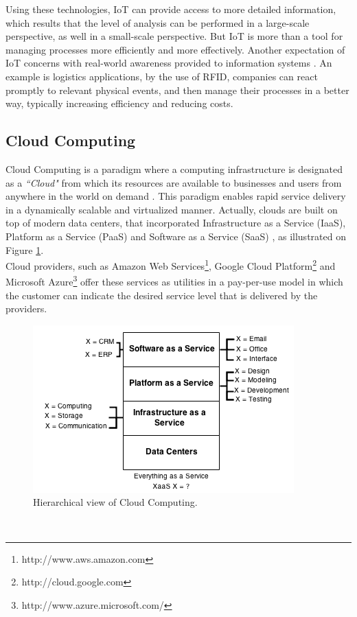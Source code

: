 Using these technologies, IoT can provide access to more detailed information, which results
that the level of analysis can be performed in a large-scale perspective, as well in a
small-scale perspective. But IoT is more than a tool for managing processes more
efficiently and more effectively. Another expectation of IoT concerns with real-world
awareness provided to information systems \cite{mattern2010internet}. An example is logistics
applications, by the use of RFID, companies can react promptly to relevant physical events,
and then manage their processes in a better way, typically increasing efficiency and
reducing costs.
\subsection{Cloud Computing}
\label{sub:cloud_computing}
Cloud Computing is a paradigm where a computing infrastructure is designated as a \textit{``Cloud"}
from which its resources are available to businesses and users from anywhere in the
world on demand \cite{buyya2009cloud}. This paradigm enables rapid service delivery in
a dynamically scalable and virtualized manner. Actually, clouds are built on top of
modern data centers, that incorporated Infrastructure as a Service (IaaS), Platform as a Service (PaaS)
and Software as a Service (SaaS) \cite{tsai2010service}, as illustrated on Figure \ref{fig:high_level_cloud_view}.\\

Cloud providers, such as Amazon Web Services\footnote{http://www.aws.amazon.com},
Google Cloud Platform\footnote{http://cloud.google.com} and Microsoft Azure\footnote{http://www.azure.microsoft.com/}
offer these services as utilities in a pay-per-use model in which the customer can
indicate the desired service level that is delivered by the providers.
\begin{figure}[h!]
  \centering
  \includegraphics[width=.8\textwidth]{./images/high_level_cloud_view}
  \caption{Hierarchical view of Cloud Computing.}
  \label{fig:high_level_cloud_view}
\end{figure}\\

